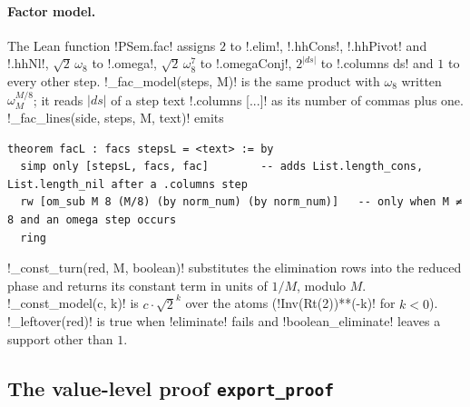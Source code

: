 {{{\paragraph{Factor model.} The Lean function \lexlean!PSem.fac! assigns $2$ to \lexlean!.elim!,
\lexlean!.hhCons!, \lexlean!.hhPivot! and \lexlean!.hhNl!, $\sqrt2\,\omega_8$ to \lexlean!.omega!,
$\sqrt2\,\omega_8^{7}$ to \lexlean!.omegaConj!, $2^{|ds|}$ to \lexlean!.columns ds! and $1$ to every
other step. \lexpy!_fac_model(steps, M)! is the same product with $\omega_8$ written
$\omega_M^{M/8}$; it reads $|ds|$ of a step text \lexcode!.columns [...]! as its number of commas
plus one. \lexpy!_fac_lines(side, steps, M, text)! emits
\begin{lstlisting}[style=lexlean]
theorem facL : facs stepsL = <text> := by
  simp only [stepsL, facs, fac]        -- adds List.length_cons, List.length_nil after a .columns step
  rw [om_sub M 8 (M/8) (by norm_num) (by norm_num)]   -- only when M ≠ 8 and an omega step occurs
  ring
\end{lstlisting}
\lexpy!_const_turn(red, M, boolean)! substitutes the elimination rows into the reduced phase and
returns its constant term in units of $1/M$, modulo $M$. \lexpy!_const_model(c, k)! is
$c\cdot\sqrt2^{k}$ over the atoms (\lexpy!Inv(Rt(2))**(-k)! for $k<0$). \lexpy!_leftover(red)! is true
when \lexpy!eliminate! fails and \lexpy!boolean_eliminate! leaves a support other than $1$.

\subsection{The value-level proof \texttt{export\_proof}}

}}}

